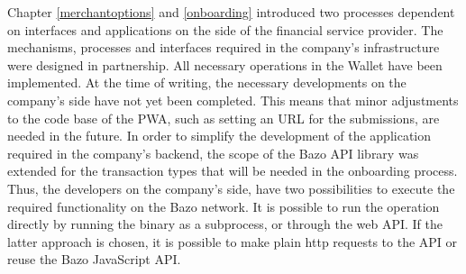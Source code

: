Chapter \ref{merchantoptions} and \ref{onboarding} introduced two processes dependent on interfaces and applications on the side of the financial service provider. The mechanisms, processes and interfaces required in the company's infrastructure were designed in partnership. All necessary operations in the Wallet have been implemented. At the time of writing, the necessary developments on the company's side have not yet been completed. This means that minor adjustments to the code base of the PWA, such as setting an URL for the submissions, are needed in the future. In order to simplify the development of the application required in the company's backend, the scope of the Bazo API library was extended for the transaction types that will be needed in the onboarding process. Thus, the developers on the company's side, have two possibilities to execute the required functionality on the Bazo network. It is possible to run the operation directly by running the binary as a subprocess, or through the web API. If the latter approach is chosen, it is possible to make plain http requests to the API or reuse the Bazo JavaScript API.
\newpage
